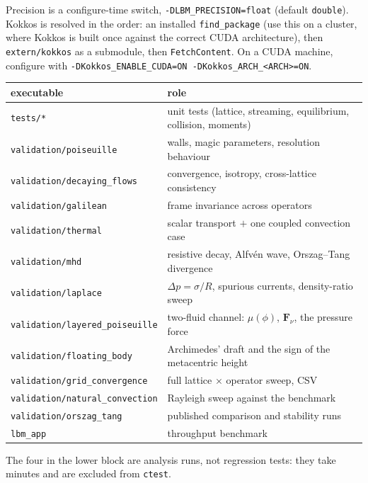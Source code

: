 \documentclass[11pt,a4paper]{article}
\newcommand{\code}[1]{\texttt{\small #1}}
\begin{document}
\noindent Precision is a configure-time switch, \code{-DLBM\_PRECISION=float}
(default \code{double}). Kokkos is resolved in the order: an installed
\code{find\_package} (use this on a cluster, where Kokkos is built once against
the correct CUDA architecture), then \code{extern/kokkos} as a submodule, then
\code{FetchContent}. On a CUDA machine, configure with
\code{-DKokkos\_ENABLE\_CUDA=ON -DKokkos\_ARCH\_<ARCH>=ON}.

\begin{center}\small
\begin{tabular}{ll}
\toprule
executable & role \\
\midrule
\code{tests/*}                    & unit tests (lattice, streaming, equilibrium, collision, moments) \\
\code{validation/poiseuille}      & walls, magic parameters, resolution behaviour \\
\code{validation/decaying\_flows} & convergence, isotropy, cross-lattice consistency \\
\code{validation/galilean}        & frame invariance across operators \\
\code{validation/thermal}         & scalar transport $+$ one coupled convection case \\
\code{validation/mhd}             & resistive decay, Alfv\'en wave, Orszag--Tang divergence \\
\code{validation/laplace}         & $\Delta p = \sigma/R$, spurious currents, density-ratio sweep \\
\code{validation/layered\_poiseuille} & two-fluid channel: $\mu(\phi)$, $\bm{F}_\nu$, the pressure force \\
\code{validation/floating\_body}  & Archimedes' draft and the sign of the metacentric height \\
\midrule
\code{validation/grid\_convergence}   & full lattice $\times$ operator sweep, CSV \\
\code{validation/natural\_convection} & Rayleigh sweep against the benchmark \\
\code{validation/orszag\_tang}        & published comparison and stability runs \\
\code{lbm\_app}                       & throughput benchmark \\
\bottomrule
\end{tabular}
\end{center}

\noindent The four in the lower block are analysis runs, not regression tests:
they take minutes and are excluded from \code{ctest}.
\end{document}
